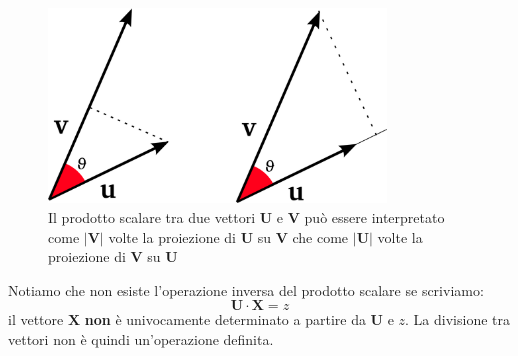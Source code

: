 \documentclass[a4paper,10pt,oneside]{article}
\begin{document}
\begin{figure}[H]
 \centering
 \includegraphics[width=0.8\textwidth]{./immagini/prodotto_scalare.png}
 \caption{Il prodotto scalare tra due vettori $\mathbf{U}$ e $\mathbf{V}$ può essere interpretato come $|\mathbf{V}|$ volte la proiezione di $\mathbf{U}$ su $\mathbf{V}$ che come $|\mathbf{U}|$ volte la proiezione di $\mathbf{V}$ su $\mathbf{U}$ }
 \label{fig:prodotto_scalare}
\end{figure}


Notiamo che non esiste l'operazione inversa del prodotto scalare se scriviamo:
\begin{equation}
 \mathbf{U}\cdot\mathbf{X}=z
\end{equation}
il vettore $\mathbf{X}$ \textbf{non} è univocamente determinato a partire da $\mathbf{U}$ e $z$. La divisione tra vettori non è quindi un'operazione definita.
\end{document}

